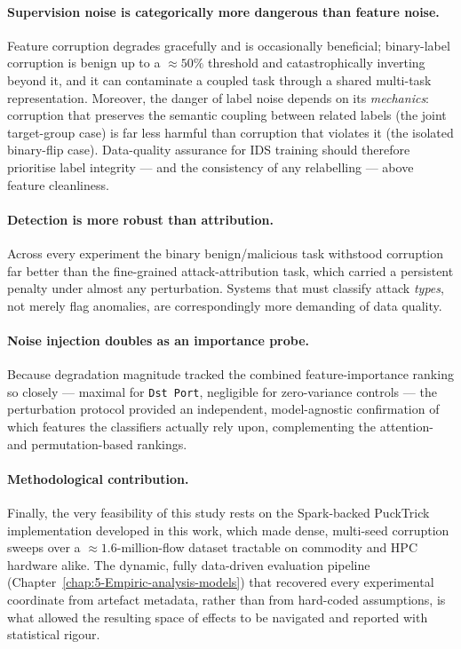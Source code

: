 \documentclass[../main.tex]{subfiles}
\begin{document}
\paragraph{Supervision noise is categorically more dangerous than feature noise.}
Feature corruption degrades gracefully and is occasionally beneficial; binary-label corruption is benign up to a $\approx 50\%$ threshold and catastrophically inverting beyond it, and it can contaminate a coupled task through a shared multi-task representation. Moreover, the danger of label noise depends on its \emph{mechanics}: corruption that preserves the semantic coupling between related labels (the joint target-group case) is far less harmful than corruption that violates it (the isolated binary-flip case). Data-quality assurance for IDS training should therefore prioritise label integrity --- and the consistency of any relabelling --- above feature cleanliness.

\paragraph{Detection is more robust than attribution.}
Across every experiment the binary benign/malicious task withstood corruption far better than the fine-grained attack-attribution task, which carried a persistent penalty under almost any perturbation. Systems that must classify attack \emph{types}, not merely flag anomalies, are correspondingly more demanding of data quality.

\paragraph{Noise injection doubles as an importance probe.}
Because degradation magnitude tracked the combined feature-importance ranking so closely --- maximal for \texttt{Dst Port}, negligible for zero-variance controls --- the perturbation protocol provided an independent, model-agnostic confirmation of which features the classifiers actually rely upon, complementing the attention- and permutation-based rankings.

\paragraph{Methodological contribution.}
Finally, the very feasibility of this study rests on the Spark-backed PuckTrick implementation developed in this work, which made dense, multi-seed corruption sweeps over a $\approx 1.6$-million-flow dataset tractable on commodity and HPC hardware alike. The dynamic, fully data-driven evaluation pipeline (Chapter~\ref{chap:5-Empiric-analysis-models}) that recovered every experimental coordinate from artefact metadata, rather than from hard-coded assumptions, is what allowed the resulting space of effects to be navigated and reported with statistical rigour.
\end{document}
